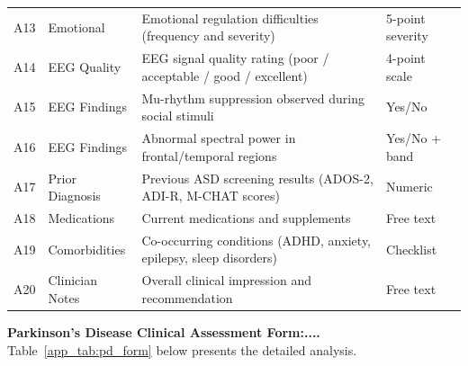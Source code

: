 {\begin{xltabular}{\textwidth}{@{} >{\raggedright\arraybackslash}p{0.5cm} >{\raggedright\arraybackslash}p{2.0cm} L p{1.4cm} @{}}
\addlinespace
A13 & Emotional & Emotional regulation difficulties (frequency and severity) & 5-point severity \\
\addlinespace
A14 & EEG Quality & EEG signal quality rating (poor / acceptable / good / excellent) & 4-point scale \\
\addlinespace
A15 & EEG Findings & Mu-rhythm suppression observed during social stimuli & Yes/No \\
\addlinespace
A16 & EEG Findings & Abnormal spectral power in frontal/temporal regions & Yes/No + band \\
\addlinespace
A17 & Prior Diagnosis & Previous ASD screening results (ADOS-2, ADI-R, M-CHAT scores) & Numeric \\
\addlinespace
A18 & Medications & Current medications and supplements & Free text \\
\addlinespace
A19 & Comorbidities & Co-occurring conditions (ADHD, anxiety, epilepsy, sleep disorders) & Checklist \\
\addlinespace
A20 & Clinician Notes & Overall clinical impression and recommendation & Free text \\
\end{xltabular}}

\noindent\textbf{Parkinson's Disease Clinical Assessment Form:....} Table~\ref{app_tab:pd_form} below presents the detailed analysis.

